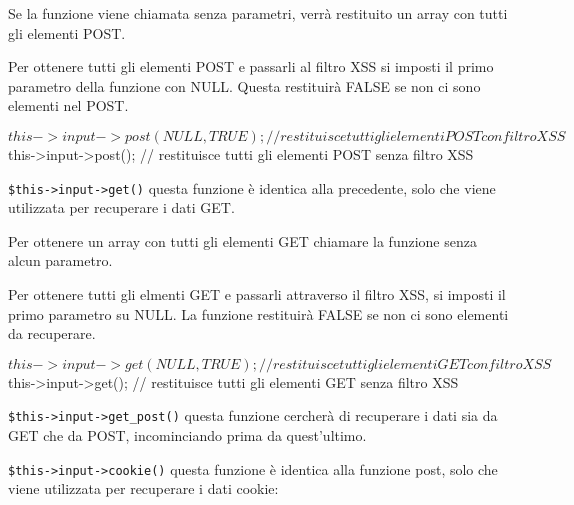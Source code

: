 
Se la funzione viene chiamata senza parametri, verrà restituito un array con tutti gli elementi POST.

Per ottenere tutti gli elementi POST e passarli al filtro \ac{XSS} si imposti il primo parametro della funzione con NULL. Questa restituirà FALSE se non ci sono elementi nel POST.

\begin{code}
$this->input->post(NULL, TRUE); // restituisce tutti gli elementi POST con filtro XSS
$this->input->post(); // restituisce tutti gli elementi POST senza filtro XSS
\end{code}

\verb|$this->input->get()| questa funzione è identica alla precedente, solo che viene utilizzata per recuperare i dati GET.


Per ottenere un array con tutti gli elementi GET chiamare la funzione senza alcun parametro.

Per ottenere tutti gli elmenti GET e passarli attraverso il filtro \ac{XSS}, si imposti il primo parametro su NULL. La funzione restituirà FALSE se non ci sono elementi da recuperare.

\begin{code}
$this->input->get(NULL, TRUE); // restituisce tutti gli elementi GET con filtro XSS
$this->input->get(); // restituisce tutti gli elementi GET senza filtro XSS
\end{code}

\verb|$this->input->get_post()| questa funzione cercherà di recuperare i dati sia da GET che da POST, incominciando prima da quest'ultimo.


\verb|$this->input->cookie()| questa funzione è identica alla funzione post, solo che viene utilizzata per recuperare i dati cookie:


